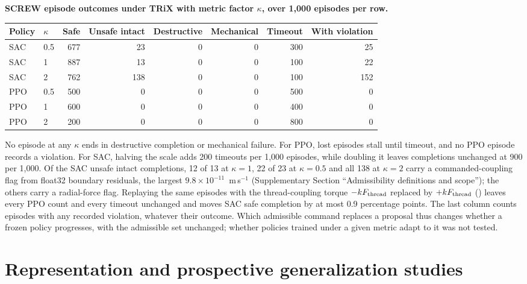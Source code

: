 \documentclass[10pt]{article}
\begin{document}
\par\noindent\begin{minipage}{\linewidth}\begin{center}
\small
\textbf{SCREW episode outcomes under TRiX with metric factor $\kappa$, over 1,000 episodes per row.}\\[4pt]
\setlength{\tabcolsep}{6pt}
\begin{tabular}{@{}llrrrrrr@{}}
\toprule
Policy & $\kappa$ & Safe & Unsafe intact & Destructive & Mechanical & Timeout & With violation\\
\midrule
SAC & 0.5 & 677 & 23 & 0 & 0 & 300 & 25\\
SAC & 1 & 887 & 13 & 0 & 0 & 100 & 22\\
SAC & 2 & 762 & 138 & 0 & 0 & 100 & 152\\
\addlinespace
PPO & 0.5 & 500 & 0 & 0 & 0 & 500 & 0\\
PPO & 1 & 600 & 0 & 0 & 0 & 400 & 0\\
PPO & 2 & 200 & 0 & 0 & 0 & 800 & 0\\
\bottomrule
\end{tabular}
\end{center}\end{minipage}\par


No episode at any $\kappa$ ends in destructive completion or mechanical
failure. For PPO, lost episodes stall until timeout, and no PPO episode records a
violation. For SAC, halving the scale adds 200 timeouts per 1,000 episodes, while
doubling it leaves completions unchanged at 900 per 1,000. Of the SAC unsafe intact
completions, 12 of 13 at $\kappa=1$, 22 of 23 at $\kappa=0.5$ and all 138 at
$\kappa=2$ carry a commanded-coupling flag from float32 boundary residuals, the
largest $9.8\times10^{-11}$~m\,s$^{-1}$ (Supplementary Section ``Admissibility
definitions and scope''); the others carry a radial-force flag. Replaying the same
episodes with the thread-coupling torque $-kF_{\rm thread}$ replaced by
$+kF_{\rm thread}$ () leaves every PPO count
and every timeout unchanged and moves SAC safe completion by at most 0.9
percentage points. The last column counts episodes with any recorded violation,
whatever their outcome. Which admissible command replaces a
proposal thus changes whether a frozen policy progresses, with the admissible set unchanged; whether policies trained under a given metric adapt
to it was not tested.
\section{Representation and prospective generalization studies}
\end{document}
